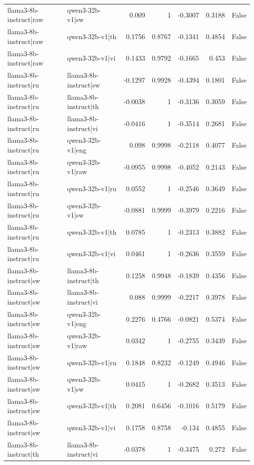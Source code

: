 \begin{table}
\begin{tabular}{l l r r r r l}
llama3-8b-instruct|raw & qwen3-32b-v1|sw & 0.009 & 1 & -0.3007 & 0.3188 & False \\
llama3-8b-instruct|raw & qwen3-32b-v1|th & 0.1756 & 0.8767 & -0.1341 & 0.4854 & False \\
llama3-8b-instruct|raw & qwen3-32b-v1|vi & 0.1433 & 0.9792 & -0.1665 & 0.453 & False \\
llama3-8b-instruct|ru & llama3-8b-instruct|sw & -0.1297 & 0.9928 & -0.4394 & 0.1801 & False \\
llama3-8b-instruct|ru & llama3-8b-instruct|th & -0.0038 & 1 & -0.3136 & 0.3059 & False \\
llama3-8b-instruct|ru & llama3-8b-instruct|vi & -0.0416 & 1 & -0.3514 & 0.2681 & False \\
llama3-8b-instruct|ru & qwen3-32b-v1|eng & 0.098 & 0.9998 & -0.2118 & 0.4077 & False \\
llama3-8b-instruct|ru & qwen3-32b-v1|raw & -0.0955 & 0.9998 & -0.4052 & 0.2143 & False \\
llama3-8b-instruct|ru & qwen3-32b-v1|ru & 0.0552 & 1 & -0.2546 & 0.3649 & False \\
llama3-8b-instruct|ru & qwen3-32b-v1|sw & -0.0881 & 0.9999 & -0.3979 & 0.2216 & False \\
llama3-8b-instruct|ru & qwen3-32b-v1|th & 0.0785 & 1 & -0.2313 & 0.3882 & False \\
llama3-8b-instruct|ru & qwen3-32b-v1|vi & 0.0461 & 1 & -0.2636 & 0.3559 & False \\
llama3-8b-instruct|sw & llama3-8b-instruct|th & 0.1258 & 0.9948 & -0.1839 & 0.4356 & False \\
llama3-8b-instruct|sw & llama3-8b-instruct|vi & 0.088 & 0.9999 & -0.2217 & 0.3978 & False \\
llama3-8b-instruct|sw & qwen3-32b-v1|eng & 0.2276 & 0.4766 & -0.0821 & 0.5374 & False \\
llama3-8b-instruct|sw & qwen3-32b-v1|raw & 0.0342 & 1 & -0.2755 & 0.3439 & False \\
llama3-8b-instruct|sw & qwen3-32b-v1|ru & 0.1848 & 0.8232 & -0.1249 & 0.4946 & False \\
llama3-8b-instruct|sw & qwen3-32b-v1|sw & 0.0415 & 1 & -0.2682 & 0.3513 & False \\
llama3-8b-instruct|sw & qwen3-32b-v1|th & 0.2081 & 0.6456 & -0.1016 & 0.5179 & False \\
llama3-8b-instruct|sw & qwen3-32b-v1|vi & 0.1758 & 0.8758 & -0.134 & 0.4855 & False \\
llama3-8b-instruct|th & llama3-8b-instruct|vi & -0.0378 & 1 & -0.3475 & 0.272 & False \\

\end{tabular}
\end{table}

